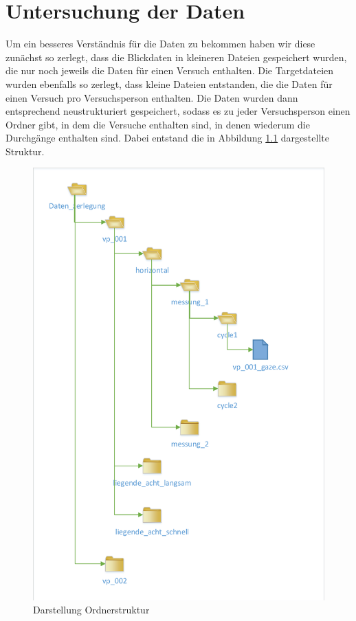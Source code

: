 \chapter{Untersuchung der Daten}

Um ein besseres Verst\"andnis f\"ur die Daten zu bekommen haben wir diese zun\"achst so zerlegt, dass die Blickdaten in kleineren Dateien gespeichert wurden, die nur noch jeweils die Daten f\"ur einen Versuch enthalten. Die Targetdateien wurden ebenfalls so zerlegt, dass kleine Dateien entstanden, die die Daten f\"ur einen Versuch pro Versuchsperson enthalten.
Die Daten wurden dann entsprechend neustrukturiert gespeichert, sodass es zu jeder Versuchsperson einen Ordner gibt, in dem die Versuche enthalten sind, in denen wiederum die Durchg\"ange enthalten sind. Dabei entstand die in Abbildung \ref{fig:Ordnerstruktur} dargestellte Struktur.

\begin{figure}[H]
	\noindent \begin{centering}
		\includegraphics[width=15cm]{pics/Darstellung-Ordnerstruktur.pdf}
		\par\end{centering}
	\caption{\label{fig:Ordnerstruktur}Darstellung Ordnerstruktur}
\end{figure}

